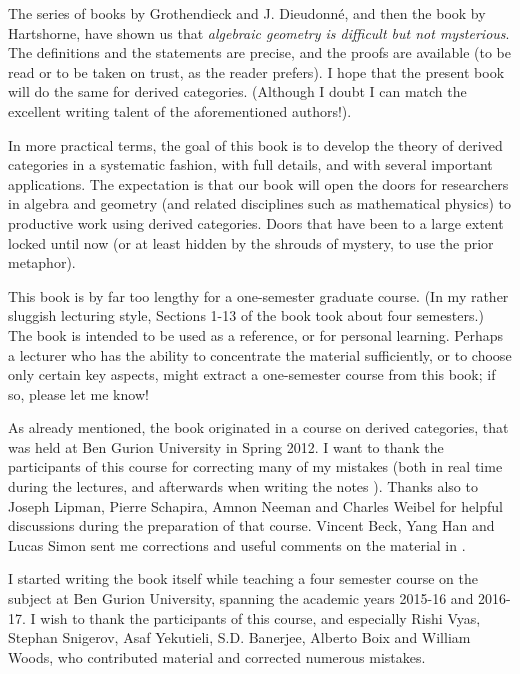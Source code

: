 The  series of books \cite{EGA} by Grothendieck and J. Dieudonn\'e, and then 
the book \cite{Har} by Hartshorne, have shown us that {\em algebraic geometry 
is difficult but not mysterious}. The definitions and the statements are 
precise, and the proofs are available (to be read or to be taken on trust, as 
the reader prefers). I hope that the present book will do the same for derived 
categories. (Although I doubt I can match the excellent writing talent of the 
aforementioned authors!).

In more practical terms, the goal of this book is to develop the theory of 
derived categories in a systematic fashion, with full details, and with several 
important applications. The expectation is that our book will open the doors 
for researchers in algebra and geometry (and related disciplines such as 
mathematical physics) to productive work using derived categories. Doors 
that have been to a large extent locked until now (or at least hidden by the 
shrouds of mystery, to use the prior metaphor). 

This book is by far too lengthy for a one-semester graduate course.
(In my rather sluggish lecturing style, Sections 1-13 of the book took about 
four semesters.) The book is intended to be used as a reference, or for 
personal learning. Perhaps a lecturer who has the ability to concentrate the 
material sufficiently, or to choose only certain key aspects, might extract a 
one-semester course from this book; if so, please let me know!




As already mentioned, the book originated in a course on derived categories, 
that was held at Ben Gurion University in Spring 2012. I want to thank the 
participants of this course for correcting many of my mistakes
(both in real time during the lectures, and afterwards when writing the notes 
\cite{Ye6}).  Thanks also to Joseph Lipman, Pierre Schapira, Amnon Neeman 
and Charles Weibel for helpful discussions during the preparation of that 
course. Vincent Beck, Yang Han and Lucas Simon sent me corrections and useful 
comments on the material in \cite{Ye6}.  

I started writing the book itself while teaching a four
semester course on the subject at Ben Gurion University, spanning the 
academic years 2015-16 and 2016-17. I wish to thank the participants of this 
course, and especially Rishi Vyas, Stephan Snigerov, Asaf Yekutieli, S.D. 
Banerjee, Alberto Boix and William Woods, who contributed material and 
corrected numerous  mistakes. 

